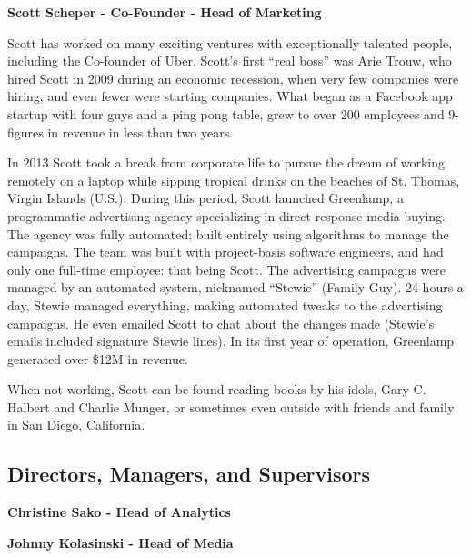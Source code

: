 \documentclass{article}
\begin{document}
\begin {framed}
\begin {center}
\textbf{Scott Scheper - Co-Founder - Head of Marketing}\par
\end {center}
Scott has worked on many exciting ventures with exceptionally talented people, including the Co-founder of Uber. Scott's first ``real boss'' was Arie Trouw, who hired Scott in 2009 during an economic recession, when very few companies were hiring, and even fewer were starting companies. What began as a Facebook app startup with four guys and a ping pong table, grew to over 200 employees and 9-figures in revenue in less than two years.

In 2013 Scott took a break from corporate life to pursue the dream of working remotely on a laptop while sipping tropical drinks on the beaches of St. Thomas, Virgin Islands (U.S.). During this period, Scott launched Greenlamp, a programmatic advertising agency specializing in direct-response media buying. The agency was fully automated; built entirely using algorithms to manage the campaigns. The team was built with project-basis software engineers, and had only one full-time employee: that being Scott. The advertising campaigns were managed by an automated system, nicknamed ``Stewie'' (Family Guy). 24-hours a day, Stewie managed everything, making automated tweaks to the advertising campaigns. He even emailed Scott to chat about the changes made (Stewie's emails included signature Stewie lines). In its first year of operation, Greenlamp generated over \$12M in revenue.

When not working, Scott can be found reading books by his idols, Gary C. Halbert and Charlie Munger, or sometimes even outside with friends and family in San Diego, California.

\end {framed}

\subsection{Directors, Managers, and Supervisors}
\begin {framed}
\begin {center}
\textbf{Christine Sako - Head of Analytics}
\end {center}
\end {framed}

\begin {framed}
\begin {center}
\textbf{Johnny Kolasinski - Head of Media}
\end {center}
\end {framed}
\end{document}
